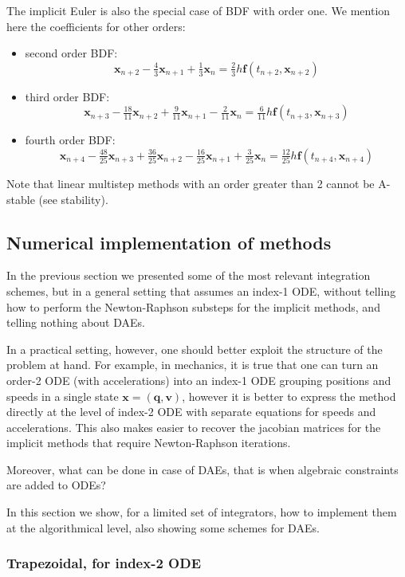 \documentclass{digitaldynamics}
\def\vect#1{\bm{#1}}
\begin{document}
The implicit Euler is also the special case of BDF with order one. We mention here the coefficients for other orders:
\begin{itemize}
	\item second order BDF: 
	\[
	\vect{x}_{n+2} - \tfrac43 \vect{x}_{n+1} + \tfrac13 \vect{x}_n = \tfrac23 h \vect{f}(t_{n+2}, \vect{x}_{n+2})
	\]
	\item third order BDF: 
	\[
	\vect{x}_{n+3} - \tfrac{18}{11} \vect{x}_{n+2} + \tfrac9{11} \vect{x}_{n+1} - \tfrac2{11} \vect{x}_n = \tfrac6{11} h \vect{f}(t_{n+3}, \vect{x}_{n+3})
	\]
	\item fourth order BDF: 
	\[
	\vect{x}_{n+4} - \tfrac{48}{25} \vect{x}_{n+3} + \tfrac{36}{25} \vect{x}_{n+2} - \tfrac{16}{25} \vect{x}_{n+1} + \tfrac{3}{25} \vect{x}_n = \tfrac{12}{25} h \vect{f}(t_{n+4}, \vect{x}_{n+4})
	\]
\end{itemize}

Note that linear multistep methods with an order greater than 2 cannot be A-stable (see stability).



\subsection{Numerical implementation of methods}

In the previous section we presented some of the most relevant integration schemes, but in a general setting that assumes an index-1 ODE, without telling how to perform the Newton-Raphson substeps for the implicit methods, and telling nothing about DAEs. 

In a practical setting, however, one should better exploit the structure of the problem at hand. For example, in mechanics, it is true that one can turn an order-2 ODE (with accelerations) into an index-1 ODE grouping positions and speeds in a single state $\vect{x}=(\vect{q},\vect{v})$, however it is better to express the method directly at the level of index-2 ODE with separate equations for speeds and accelerations. This also makes easier to recover the jacobian matrices for the implicit methods that require Newton-Raphson iterations.

Moreover, what can be done in case of DAEs, that is when algebraic constraints are added to ODEs?

In this section we show, for a limited set of integrators, how to implement them at the algorithmical level, also showing some schemes for DAEs.


\subsubsection{Trapezoidal, for index-2 ODE}
\end{document}
